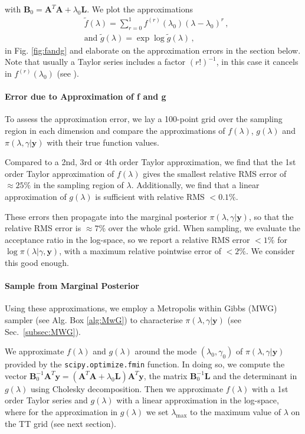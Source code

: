 with $\bm{B}_0 = \bm{A}^T  \bm{A} + \lambda_0 \bm{L}$.
We plot the approximations
\begin{subequations}
	\label{eq:fandg}
	\begin{align}
		&\tilde{f} ( \lambda) = \sum^1_{r=0} 	f^{(r)}(\lambda_0) (\lambda-\lambda_0)^r  \label{eq:fAprox} \, ,  \\
		&\text{and } \tilde{g} (\lambda) = \exp \log{\tilde{g}(\lambda)}  \label{eq:gAprox} \, ,
	\end{align}
\end{subequations} in Fig. \ref{fig:fandg} and elaborate on the approximation errors in the section below.
Note that usually a Taylor series includes a factor $(r!)^{-1}$, in this case it cancels in $f^{(r)}(\lambda_0)$ (see \cite{fox2016fast}).

\paragraph{Error due to Approximation of f and g}
To assess the approximation error, we lay a 100-point grid over the sampling region in each dimension and compare the approximations of $f(\lambda)$, $g(\lambda)$ and $\pi(\lambda, \gamma | \bm{y})$ with their true function values.

Compared to a 2nd, 3rd or 4th order Taylor approximation, we find that the 1st order Taylor approximation of $f(\lambda)$ gives the smallest relative RMS error of $\approx 25 \%$ in the sampling region of $\lambda$.
Additionally, we find that a linear approximation of $g(\lambda)$ is sufficient with relative RMS $<0.1\%$.

These errors then propagate into the marginal posterior $\pi(\lambda , \gamma| \bm{y})$, so that the relative RMS error is $\approx 7 \%$ over the whole grid.
When sampling, we evaluate the acceptance ratio in the log-space, so we report a relative RMS error $< 1\%$ for $\log{\pi(\lambda| \gamma, \bm{y})}$, with a maximum relative pointwise error of $< 2\%$.
We consider this good enough.

\paragraph{Sample from Marginal Posterior}
Using these approximations, we employ a Metropolis within Gibbs (MWG) sampler (see Alg. Box \ref{alg:MwG}) to characterise $\pi(\lambda,\gamma|\bm{y})$ (see Sec.~\ref{subsec:MWG}).

We approximate $f(\lambda)$  and $g(\lambda)$ around the mode $( \lambda_{0}, \gamma_0 )$ of $\pi(\lambda,\gamma| \bm{y})$ provided by the \texttt{scipy.optimize.fmin} function.
In doing so, we compute the vector $\bm{B}_0^{-1}\bm{A}^T\bm{y} = (\bm{A}^T\bm{A} + \lambda_0 \bm{L})\bm{A}^T\bm{y} $, the matrix $\bm{B}_0^{-1}\bm{L}$ and the determinant in $g(\lambda)$ using Cholesky decomposition.
Then we approximate $f(\lambda)$ with a 1st order Taylor series and $g(\lambda)$ with a linear approximation in the log-space, where for the approximation in $g(\lambda)$ we set $\lambda_{\text{max}}$ to the maximum value of $\lambda$ on the TT grid (see next section).

